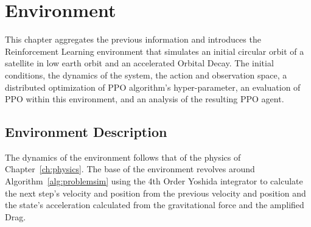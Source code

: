\chapter{Environment}\label{ch:environment}

This chapter aggregates the previous information and introduces the Reinforcement Learning environment that simulates an initial circular orbit of a satellite in low earth orbit and an accelerated Orbital Decay. The initial conditions, the dynamics of the system, the action and observation space, a distributed optimization of PPO algorithm's hyper-parameter, an evaluation of PPO within this environment, and an analysis of the resulting PPO agent.

\section{Environment Description}

The dynamics of the environment follows that of the physics of Chapter~\ref{ch:physics}. The base of the environment revolves around Algorithm~\ref{alg:problemsim} using the 4th Order Yoshida integrator to calculate the next step's velocity and position from the previous velocity and position and the state's acceleration calculated from the gravitational force and the amplified Drag. 

